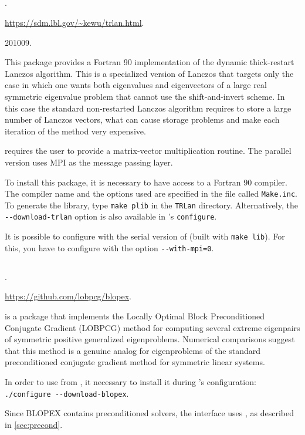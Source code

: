 \subsection*{\underline{\trlan}}
	\begin{description}
	\setlength{\itemsep}{0pt}
	\item[References.]\citep{Wu:2000:TLM}.
	\item[Website.] \url{https://sdm.lbl.gov/\~kewu/trlan.html}.
	\item[Version.] 201009.
	\item[Summary.] This package provides a Fortran 90 implementation of the dynamic thick-restart Lanczos algorithm. This is a specialized version of Lanczos that targets only the case in which one wants both eigenvalues and eigenvectors of a large real symmetric eigenvalue problem that cannot use the shift-and-invert scheme. In this case the standard non-restarted Lanczos algorithm requires to store a large number of Lanczos vectors, what can cause storage problems and make each iteration of the method very expensive.

	\trlan{} requires the user to provide a matrix-vector multiplication routine. The parallel version uses MPI as the message passing layer.
	\item[Installation.] To install this package, it is necessary to have access to a Fortran 90 compiler. The compiler name and the options used are specified in the file called \texttt{Make.inc}. To generate the library, type \texttt{make plib} in the \texttt{TRLan} directory. Alternatively, the \texttt{-{}-download-trlan} option is also available in \slepc's \texttt{configure}.

	It is possible to configure \slepc with the serial version of \trlan (built with \texttt{make lib}). For this, you have to configure \petsc with the option \texttt{-{}-with-mpi=0}.
	\end{description}

\subsection*{\underline{\blopex}}
	\begin{description}
	\setlength{\itemsep}{0pt}
	\item[References.]\citep{Knyazev:2007:BLO}.
	\item[Website.] \url{https://github.com/lobpcg/blopex}.
	\item[Summary.] \blopex is a package that implements the Locally Optimal Block Preconditioned Conjugate Gradient (LOBPCG) method for computing several extreme eigenpairs of symmetric positive generalized eigenproblems. Numerical comparisons suggest that this method is a genuine analog for eigenproblems of the standard preconditioned conjugate gradient method for symmetric linear systems.
	\item[Installation.] In order to use \blopex from \slepc, it necessary to install it during \slepc's configuration: \Verb!./configure --download-blopex!.
	\item[Specific options.] Since BLOPEX contains preconditioned solvers, the \slepc interface uses , as described in \ref{sec:precond}.
	\end{description}

